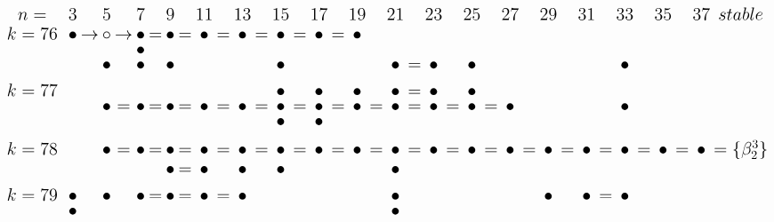 \documentclass{article}
\begin{document}
\(
\begin{tikzcd}[
nodes={font=\Large,inner sep=0pt},
row sep=0.2cm,
column sep=0.1cm
]
n= && & 3 & & 5 & & 7 & & 9 & & 11 & & 13 & & 15 & & 17 && 19 && 21 && 23 && 25 && 27 && 29 && 31 && 33 && 35 && 37 & stable \\
k=76 &&& \bullet &\rightarrow& \circ &\rightarrow& \bullet &=& \bullet &=& \bullet &=& \bullet &=& \bullet &=& \bullet &=& \bullet \\
&&& && && \bullet && && \\
&&& && \bullet && \bullet && \bullet && && && \bullet && && && \bullet &=& \bullet && \bullet && && && && \bullet && \\ \\
k=77 &&& && && && && && && \bullet && \bullet && \bullet && \bullet &=& \bullet && \bullet \\
&&& && \bullet &=& \bullet &=& \bullet &=& \bullet &=& \bullet &=& \bullet &=& \bullet &=& \bullet &=& \bullet &=& \bullet &=& \bullet &=& \bullet && && && \bullet \\
&&& && && && && && && \bullet && \bullet \\ \\
k=78 &&& && \bullet &=& \bullet &=& \bullet &=& \bullet &=& \bullet &=& \bullet &=& \bullet &=& \bullet &=& \bullet &=& \bullet &=& \bullet &=& \bullet &=& \bullet &=& \bullet &=& \bullet &=& \bullet &=& \bullet & = \{\beta_2^3\} \\
&&& && && && \bullet &=& \bullet && \bullet && \bullet && && && \bullet && \\ \\
k=79 &&& \bullet && \bullet && \bullet &=& \bullet &=& \bullet &=& \bullet && && && && \bullet && && && && \bullet && \bullet &=& \bullet \\
&&& \bullet && && && && && && && && && \bullet  \\
\\
\end{tikzcd}
\)
\end{document}
